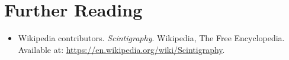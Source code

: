 \section{Further Reading}
\begin{itemize}
  \item Wikipedia contributors. \textit{Scintigraphy}. Wikipedia, The Free Encyclopedia. Available at: \url{https://en.wikipedia.org/wiki/Scintigraphy}.
\end{itemize}
